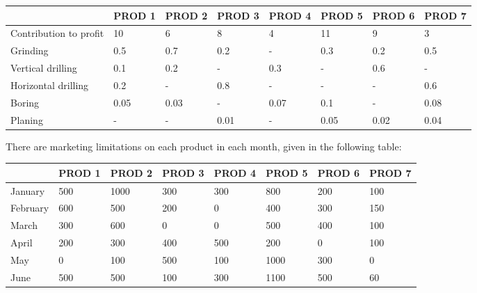 \documentclass[12pt,a4paper]{article}
\theoremstyle{definition}
\begin{document}
\begin{enumerate}
	\begin{table}[htbp]
		\scriptsize
		\centering
		\renewcommand\arraystretch{1.1}
		\begin{tabular}{m{} m{}<{\centering} m{}<{\centering} m{}<{\centering} m{}<{\centering} m{}<{\centering} m{}<{\centering} m{}<{\centering}}
			\hline
			& \textbf{PROD 1} & \textbf{PROD 2} & \textbf{PROD 3} & \textbf{PROD 4} & \textbf{PROD 5} & \textbf{PROD 6} &  \textbf{PROD 7} \\\hline
			Contribution to profit & 10 & 6 & 8 & 4 & 11 & 9 & 3 \\
			Grinding & 0.5 & 0.7 & 0.2 & - & 0.3 & 0.2 & 0.5 \\
			Vertical drilling & 0.1 & 0.2 & - & 0.3 & - & 0.6 & - \\
			Horizontal drilling & 0.2 & - & 0.8 & - & - & - & 0.6 \\
			Boring & 0.05 & 0.03 & - & 0.07 & 0.1 & - & 0.08 \\
			Planing & - & - & 0.01 & - & 0.05 & 0.02 & 0.04 \\
			\hline
		\end{tabular}
	\end{table}
	
	There are marketing limitations on each product in each month, given in the following table:
	
	\begin{table}[htbp]
		\scriptsize
		\centering
		\renewcommand\arraystretch{1.1}
		\begin{tabular}{m{} m{}<{\centering} m{}<{\centering} m{}<{\centering} m{}<{\centering} m{}<{\centering} m{}<{\centering} m{}<{\centering}}
			\hline
			& \textbf{PROD 1} & \textbf{PROD 2} & \textbf{PROD 3} & \textbf{PROD 4} & \textbf{PROD 5} & \textbf{PROD 6} &  \textbf{PROD 7} \\\hline
			January & 500 & 1000 & 300 & 300 & 800 & 200 & 100 \\
			February & 600 & 500 & 200 & 0 & 400 & 300 & 150 \\
			March & 300 & 600 & 0 & 0 & 500 & 400 & 100 \\
			April & 200 & 300 & 400 & 500 & 200 & 0 & 100 \\
			May & 0 & 100 & 500 & 100 & 1000 & 300 & 0 \\
			June & 500 & 500 & 100 & 300 & 1100 & 500 & 60 \\
			\hline
		\end{tabular}
	\end{table}
	

\end{enumerate}
\end{document}
